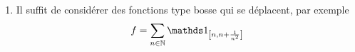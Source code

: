 {\begin{td-sol}[]
\begin{enumerate}
            On pose maintenant \(x=\lambda_1\left(\ff{0,x}\right)=\int_{\ff{0,x}}1\der\lambda_1\). Alors
            \begin{equation*}
                \begin{aligned}
                    \int_{\R_+}f(x)\one_{\fo{0,x}}\der\lambda_1
                    &\geq \int f(x)\one_{\fo{0,x}}\der\lambda_1 \\
                    &\geq f(x)\int \one_{\fo{0,x}}\der\lambda_1 \\
                    &\geq f(x) x
                \end{aligned}
            \end{equation*}
            Enfin on a
            \begin{equation*}
                \frac{\overbrace{\int_{\R_+}f\der\lambda_1}^{\in\R}}{x}\geq f(x)\quad \forall x\in\R_+
            \end{equation*}

            \item Il suffit de considérer des fonctions type bosse qui se déplacent,
            par exemple
            \begin{equation*}
                f=\sum_{n\in\N}\one_{\ff{n,n+\frac{1}{n^2}}}
            \end{equation*}
        \end{enumerate}
    \end{td-sol}
}{}

